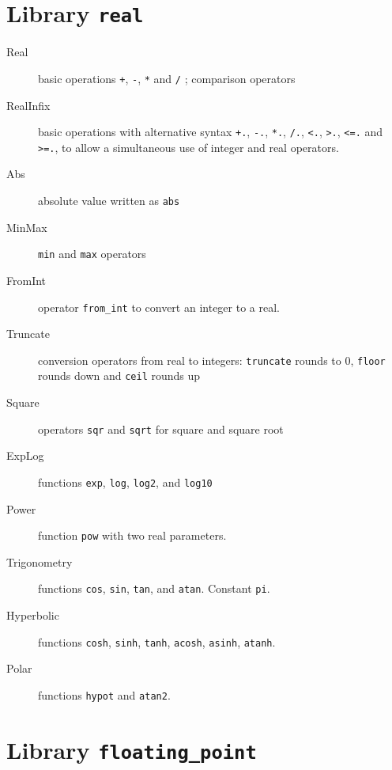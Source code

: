 \section{Library \texttt{real}}

\begin{description}

\item[Real] basic operations \verb|+|, \verb|-|, \verb|*| and \verb|/| ;
  comparison operators

\item[RealInfix] basic operations with alternative syntax \verb|+.|,
  \verb|-.|, \verb|*.|, \verb|/.|, \verb|<.|, \verb|>.|, \verb|<=.| and \verb|>=.|, to
  allow a simultaneous use of integer and real operators.

\item[Abs] absolute value written as \verb|abs|

\item[MinMax] \verb|min| and \verb|max| operators

\item[FromInt] operator \verb|from_int| to convert an integer to a real.

\item[Truncate] conversion operators from real to integers:
  \verb|truncate| rounds to 0, \verb|floor| rounds down and
  \verb|ceil| rounds up

\item[Square] operators \verb|sqr| and \verb|sqrt| for square and square root

\item[ExpLog] functions \verb|exp|, \verb|log|, \verb|log2|, and \verb|log10|

\item[Power] function \verb|pow| with two real parameters.

\item[Trigonometry] functions \verb|cos|, \verb|sin|, \verb|tan|, and
  \verb|atan|. Constant \verb|pi|.

\item[Hyperbolic] functions \verb|cosh|, \verb|sinh|, \verb|tanh|,
  \verb|acosh|, \verb|asinh|, \verb|atanh|.

\item[Polar] functions \verb|hypot| and \verb|atan2|.

\end{description}

\section{Library \texttt{floating\_point}}

